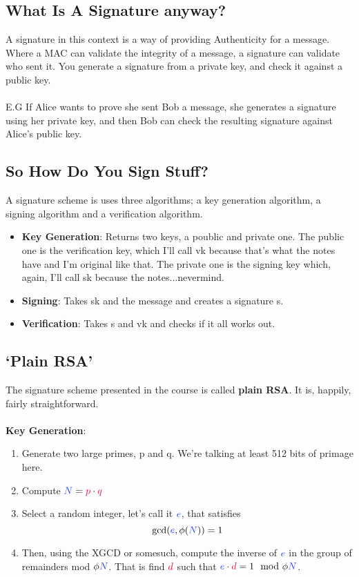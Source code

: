 	\subsection{What Is A Signature anyway?}
	A signature in this context is a way of providing Authenticity for a message. Where a MAC can validate the integrity of a message, a signature can validate who sent it. You generate a signature from a private key, and check it against a public key.\\
	\\
	E.G If Alice wants to prove she sent Bob a message, she generates a signature using her private key, and then Bob can check the resulting signature against Alice's public key.

	\subsection{So How Do You Sign Stuff?}
	A signature scheme is uses three algorithms; a key generation algorithm, a signing algorithm and a verification algorithm.
	\begin{itemize}
	\item \textbf{Key Generation}: Returns two keys, a poublic and private one. The public one is the \textcolor{B}{verification key}, which I'll call \textcolor{B}{vk} because that's what the notes have and I'm original like that. The private one is the \textcolor{R}{signing key} which, again, I'll call \textcolor{R}{sk} because the notes...nevermind.
	\item \textbf{Signing}: Takes \textcolor{R}{sk} and the message and creates a signature \textcolor{B}{s}.
	\item \textbf{Verification}: Takes \textcolor{B}{s} and \textcolor{B}{vk} and checks if it all works out.
	\end{itemize}

	\subsection{`Plain RSA'}
	The signature scheme presented in the course is called \textbf{plain RSA}. It is, happily, fairly straightforward.\\
	\\
	\textbf{Key Generation}:
	\begin{enumerate}
	\item Generate two large primes, \textcolor{R}{p} and \textcolor{R}{q}. We're talking at least 512 bits of primage here.
	\item Compute $\cN = \cp \cdot \cq$
	\item Select a random integer, let's call it $\ce$, that satisfies
	$$\text{gcd}(\ce, \phi(\cN)) = 1$$
	\item Then, using the XGCD or somesuch, compute the inverse of $\ce$ in the group of remainders mod $\phi{\cN}$. That is find $\cd$ such that $\ce \cdot \cd = 1 \mod \phi{\cN}$.
	\end{enumerate}

